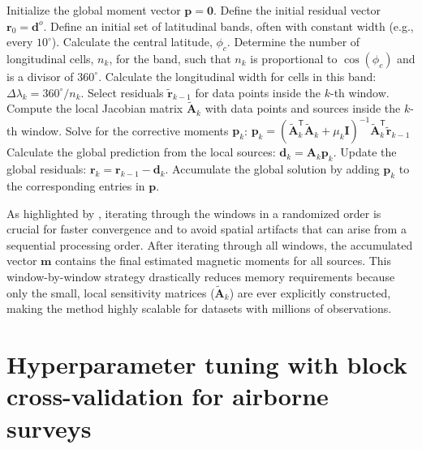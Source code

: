 \documentclass[a4paper,oneside,10pt]{book}
\begin{document}
\begin{algorithm}
\caption{Gradient-Boosted Equivalent Sources on the sphere.}
\label{alg:spherical-gradient-boosting}
\begin{algorithmic}[1]
\State Initialize the global moment vector $\mathbf{p} = \mathbf{0}$.
\State Define the initial residual vector $\mathbf{r}_0 = \mathbf{d}^o$.
\State Define an initial set of latitudinal bands, often with constant width (e.g., every $10^\circ$).
    \State Calculate the central latitude, $\phi_c$.
    \State Determine the number of longitudinal cells, $n_k$, for the band, such that $n_k$ is proportional to $\cos(\phi_c)$ and is a divisor of $360^\circ$.
    \State Calculate the longitudinal width for cells in this band: $\Delta\lambda_k = 360^\circ / n_k$.
\EndFor
{}
    \State Select residuals $\tilde{\mathbf{r}}_{k-1}$ for data points inside the $k$-th window.
    \State Compute the local Jacobian matrix $\tilde{\mathbf{A}}_k$ with data points and sources inside the $k$-th window.
    \State Solve for the corrective moments $\mathbf{p}_k$:
    \Statex \hspace{\algorithmicindent} $\mathbf{p}_k = (\tilde{\mathbf{A}}_k^\mathsf{T} \tilde{\mathbf{A}}_k + \mu_k \mathbf{I})^{-1} \tilde{\mathbf{A}}_k^\mathsf{T} \tilde{\mathbf{r}}_{k-1}$
    \State Calculate the global prediction from the local sources: $\mathbf{d}_k
    = \mathbf{A}_k \mathbf{p}_k$.
    \State Update the global residuals: $\mathbf{r}_k = \mathbf{r}_{k-1} - \mathbf{d}_k$.
    \State Accumulate the global solution by adding $\mathbf{p}_k$ to the
    corresponding entries in $\mathbf{p}$.
\EndFor
\end{algorithmic}
\end{algorithm}

As highlighted by \citet{Soler2021}, iterating through the windows in a randomized order is crucial
for faster convergence and to avoid spatial artifacts that can arise from a sequential processing
order. After iterating through all windows, the accumulated vector $\mathbf{m}$ contains the final
estimated magnetic moments for all sources. This window-by-window strategy drastically reduces memory
requirements because only the small, local sensitivity matrices ($\tilde{\mathbf{A}}_k$) are ever
explicitly constructed, making the method highly scalable for datasets with millions of observations.


\section{Hyperparameter tuning with block cross-validation for airborne surveys}
\end{document}

